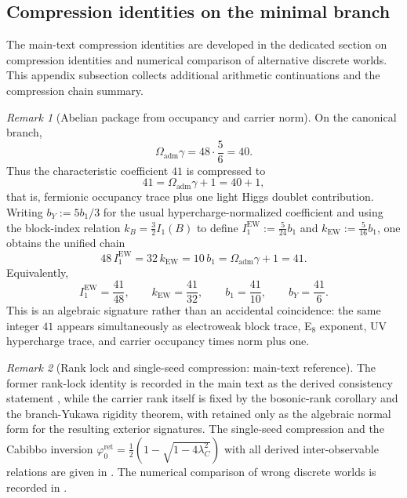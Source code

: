 \documentclass[11pt,a4paper]{article}
\theoremstyle{definition}
\theoremstyle{remark}
\newtheorem*{remark}{Remark}
\newcommand{\phiz}{\varphi_0^{\mathrm{ret}}}
\newcommand{\bone}{b_1}
\newcommand{\Oadm}{\Omega_{\mathrm{adm}}}
\begin{document}
\subsection{Compression identities on the minimal branch}

The main-text compression identities are developed in the dedicated section on compression identities
and numerical comparison of alternative discrete worlds. This appendix subsection collects
additional arithmetic continuations and the compression chain summary.

\begin{remark}[Abelian package from occupancy and carrier norm]
On the canonical branch,
\[
\Oadm\gamma=48\cdot\frac56=40.
\]
Thus the characteristic coefficient $41$ is compressed to
\[
41=\Oadm\gamma+1=40+1,
\]
that is, fermionic occupancy trace plus one light Higgs doublet contribution.
Writing $b_Y:=5\bone/3$ for the usual hypercharge-normalized coefficient and using the block-index relation $k_B=\frac32 I_1(B)$ to define $I_1^{\mathrm{EW}}:=\frac{5}{24}\bone$ and $k_{\mathrm{EW}}:=\frac{5}{16}\bone$, one obtains the unified chain
\begin{equation}
\label{eq:41-chain}
48\,I_1^{\mathrm{EW}}
=32\,k_{\mathrm{EW}}
=10\,\bone
=\Oadm\gamma+1
=41.
\end{equation}
Equivalently,
\[
I_1^{\mathrm{EW}}=\frac{41}{48},
\qquad
k_{\mathrm{EW}}=\frac{41}{32},
\qquad
\bone=\frac{41}{10},
\qquad
b_Y=\frac{41}{6}.
\]
This is an algebraic signature rather than an accidental coincidence: the same integer $41$ appears simultaneously as electroweak block trace, E$_8$ exponent, UV hypercharge trace, and carrier occupancy times norm plus one.
\end{remark}

\begin{remark}[Rank lock and single-seed compression: main-text reference]
The former rank-lock identity is recorded in the main text as the derived consistency statement
, while the carrier rank itself is fixed by the bosonic-rank corollary and the
branch-Yukawa rigidity theorem, with  retained only as the
algebraic normal form for the resulting exterior signatures.
The single-seed compression and the Cabibbo inversion $\phiz=\frac12(1-\sqrt{1-4\lambda_C^2})$
with all derived inter-observable relations are given in
. The numerical
comparison of wrong discrete worlds is recorded in .
\end{remark}
\end{document}
